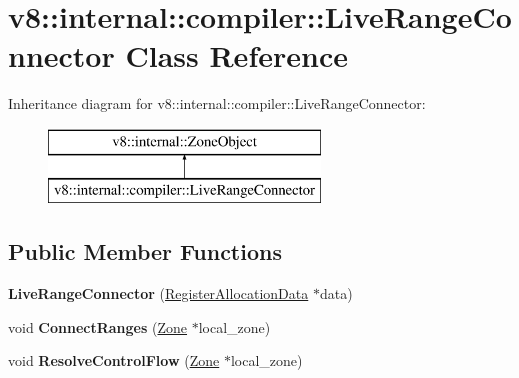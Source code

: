 \hypertarget{classv8_1_1internal_1_1compiler_1_1_live_range_connector}{}\section{v8\+:\+:internal\+:\+:compiler\+:\+:Live\+Range\+Connector Class Reference}
\label{classv8_1_1internal_1_1compiler_1_1_live_range_connector}
Inheritance diagram for v8\+:\+:internal\+:\+:compiler\+:\+:Live\+Range\+Connector\+:\begin{figure}[H]
\begin{center}
\leavevmode
\includegraphics[height=2.000000cm]{classv8_1_1internal_1_1compiler_1_1_live_range_connector}
\end{center}
\end{figure}
\subsection*{Public Member Functions}
\begin{DoxyCompactItemize}
\item 
{\bfseries Live\+Range\+Connector} (\hyperlink{classv8_1_1internal_1_1compiler_1_1_register_allocation_data}{Register\+Allocation\+Data} $\ast$data)\hypertarget{classv8_1_1internal_1_1compiler_1_1_live_range_connector_af87fa672971c6bfb118f9c3b5e0db0e5}{}\label{classv8_1_1internal_1_1compiler_1_1_live_range_connector_af87fa672971c6bfb118f9c3b5e0db0e5}

\item 
void {\bfseries Connect\+Ranges} (\hyperlink{classv8_1_1internal_1_1_zone}{Zone} $\ast$local\+\_\+zone)\hypertarget{classv8_1_1internal_1_1compiler_1_1_live_range_connector_ae335542bcf27f1fcbb39e1a8701242e3}{}\label{classv8_1_1internal_1_1compiler_1_1_live_range_connector_ae335542bcf27f1fcbb39e1a8701242e3}

\item 
void {\bfseries Resolve\+Control\+Flow} (\hyperlink{classv8_1_1internal_1_1_zone}{Zone} $\ast$local\+\_\+zone)\hypertarget{classv8_1_1internal_1_1compiler_1_1_live_range_connector_a86f4fccf715c6230a3e0ceb373f60776}{}\label{classv8_1_1internal_1_1compiler_1_1_live_range_connector_a86f4fccf715c6230a3e0ceb373f60776}

\end{DoxyCompactItemize}
